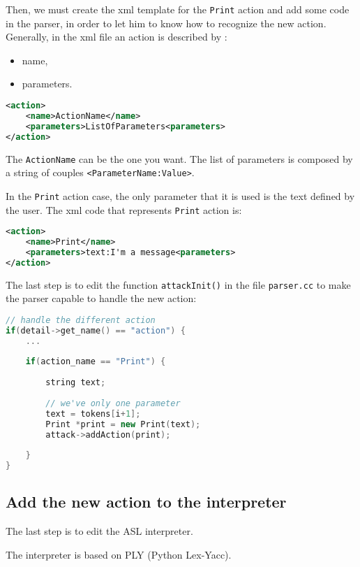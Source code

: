 Then, we must create the xml template for the \texttt{Print} action and add some code in the parser, in order to let him to know how to recognize the new action. Generally, in the xml file an action is described by :
%
\begin{itemize}
\item name,
\item parameters.
\end{itemize}
%
\begin{lstlisting}[language={xml}]
<action>
	<name>ActionName</name>
	<parameters>ListOfParameters<parameters>
</action>
\end{lstlisting}
%
The \texttt{ActionName} can be the one you want. The list of parameters is composed by a string of couples \texttt{<ParameterName:Value>}.

In the \texttt{Print} action case, the only parameter that it is used is the text defined by the user. The xml code that represents \texttt{Print} action is:
%
\begin{lstlisting}[language={xml}]
<action>
	<name>Print</name>
	<parameters>text:I'm a message<parameters>
</action>
\end{lstlisting}

The last step is to edit the function \texttt{attackInit()} in the file \texttt{parser.cc} to make the parser capable to handle the new action:
%
\begin{lstlisting}[language={cpp}]
// handle the different action
if(detail->get_name() == "action") {  
	...
	
	if(action_name == "Print") {
				
		string text;
				
		// we've only one parameter
		text = tokens[i+1];					
		Print *print = new Print(text);				
		attack->addAction(print);
				
	}	
}
\end{lstlisting}



\subsection{Add the new action to the interpreter}
The last step is to edit the ASL interpreter. 
\iffalse
To clearly understand what we are to doing now you should have a basic knowledge about to build a programming language, this isn't the right place where explain that so we divide this procedure in some steps; for more informations you can find infinite resources on the web. 
\fi
The interpreter is based on PLY (Python Lex-Yacc).

